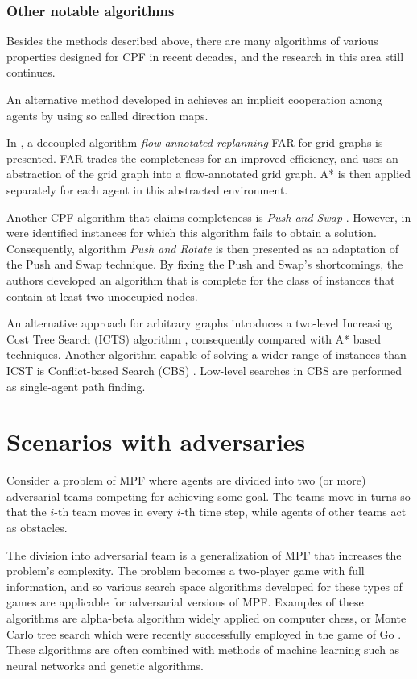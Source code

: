 \subsubsection{Other notable algorithms}

Besides the methods described above, there are many algorithms of various properties designed for CPF in recent decades, and the research in this area still continues. 

An alternative method developed in \cite{jansen08} achieves an implicit cooperation among agents by using so called direction maps.

In \cite{wang08}, a decoupled algorithm \emph{flow annotated replanning} FAR for grid graphs is presented.
FAR trades the completeness for an improved efficiency, and uses an abstraction of the grid graph into a flow-annotated grid graph.
A* is then applied separately for each agent in this abstracted environment.

Another CPF algorithm that claims completeness is \emph{Push and Swap} \cite{luna11}. 
However, in \cite{wilde13} were identified instances for which this algorithm fails to obtain a solution.
Consequently, algorithm \emph{Push and Rotate} is then presented as an adaptation of the Push and Swap technique. 
By fixing the Push and Swap’s shortcomings, the authors developed an algorithm that is complete for the class of instances that contain at least two unoccupied nodes.

An alternative approach for arbitrary graphs introduces a two-level Increasing Cost Tree Search (ICTS) algorithm \cite{sharon13}, consequently compared with A* based techniques. 
Another algorithm capable of solving a wider range of instances than ICST is Conflict-based Search (CBS) \cite{sharon13}. 
Low-level searches in CBS are performed as single-agent path finding.
\section{Scenarios with adversaries}

Consider a problem of MPF where agents are divided into two (or more) adversarial teams competing for achieving some goal.
The teams move in turns so that the $i$-th team moves in every $i$-th time step, while agents of other teams act as obstacles.

The division into adversarial team is a generalization of MPF that increases the problem's complexity.
The problem becomes a two-player game with full information, and so various search space algorithms developed for these types of games are applicable for adversarial versions of MPF.
Examples of these algorithms are alpha-beta algorithm widely applied on computer chess, or Monte Carlo tree search which were recently successfully employed in the game of Go \cite{silver16}.
These algorithms are often combined with methods of machine learning such as neural networks and genetic algorithms.

